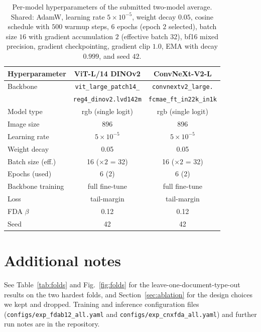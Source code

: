 \documentclass[11pt,a4paper]{article}
\begin{document}
\begin{table}[H]
\centering
\small
\setlength{\tabcolsep}{6pt}
\caption{Per-model hyperparameters of the submitted two-model average. Shared: AdamW, learning rate
$5\times10^{-5}$, weight decay $0.05$, cosine schedule with $500$ warmup steps, $6$ epochs (epoch $2$
selected), batch size $16$ with gradient accumulation $2$ (effective batch $32$), bf16 mixed precision,
gradient checkpointing, gradient clip $1.0$, EMA with decay $0.999$, and seed $42$.}
\label{tab:hparams}
\begin{tabular}{lcc}
\toprule
Hyperparameter & ViT-L/14 DINOv2 & ConvNeXt-V2-L \\
\midrule
Backbone       & \texttt{vit\_large\_patch14\_} & \texttt{convnextv2\_large.} \\
               & \texttt{reg4\_dinov2.lvd142m}  & \texttt{fcmae\_ft\_in22k\_in1k} \\
Model type     & rgb (single logit) & rgb (single logit) \\
Image size     & 896 & 896 \\
Learning rate  & $5\times10^{-5}$ & $5\times10^{-5}$ \\
Weight decay   & 0.05 & 0.05 \\
Batch size (eff.) & 16 ($\times2$ = 32) & 16 ($\times2$ = 32) \\
Epochs (used)  & 6 (2) & 6 (2) \\
Backbone training & full fine-tune & full fine-tune \\
Loss           & tail-margin & tail-margin \\
FDA $\beta$    & 0.12 & 0.12 \\
Seed           & 42 & 42 \\
\bottomrule
\end{tabular}
\end{table}

\section{Additional notes}
\label{app:notes}
See Table~\ref{tab:folds} and Fig.~\ref{fig:folds} for the leave-one-document-type-out results on the two
hardest folds, and Section~\ref{sec:ablation} for the design choices we kept and dropped. Training and
inference configuration files (\texttt{configs/exp\_fdab12\_all.yaml} and
\texttt{configs/exp\_cnxfda\_all.yaml}) and further run notes are in the repository.
\end{document}

